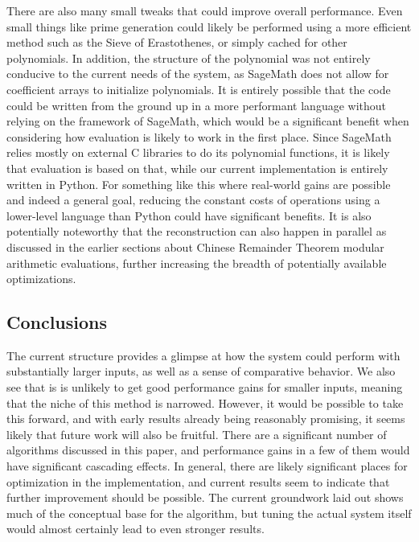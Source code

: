 \documentclass[pageno]{jpaper}
\begin{document}
There are also many small tweaks that could improve overall performance.
Even small things like prime generation could likely be performed using a more efficient method such as the Sieve of Erastothenes, or simply cached for other polynomials.
In addition, the structure of the polynomial was not entirely conducive to the current needs of the system, as SageMath does not allow for coefficient arrays to initialize polynomials.
It is entirely possible that the code could be written from the ground up in a more performant language without relying on the framework of SageMath, which would be a significant benefit when considering how evaluation is likely to work in the first place.
Since SageMath relies mostly on external C libraries to do its polynomial functions, it is likely that evaluation is based on that, while our current implementation is entirely written in Python.
For something like this where real-world gains are possible and indeed a general goal, reducing the constant costs of operations using a lower-level language than Python could have significant benefits.
It is also potentially noteworthy that the reconstruction can also happen in parallel as discussed in the earlier sections about Chinese Remainder Theorem modular arithmetic evaluations, further increasing the breadth of potentially available optimizations.
\subsection{Conclusions}
The current structure provides a glimpse at how the system could perform with substantially larger inputs, as well as a sense of comparative behavior.
We also see that is is unlikely to get good performance gains for smaller inputs, meaning that the niche of this method is narrowed.
However, it would be possible to take this forward, and with early results already being reasonably promising, it seems likely that future work will also be fruitful.
There are a significant number of algorithms discussed in this paper, and performance gains in a few of them would have significant cascading effects.
In general, there are likely significant places for optimization in the implementation, and current results seem to indicate that further improvement should be possible.
The current groundwork laid out shows much of the conceptual base for the algorithm, but tuning the actual system itself would almost certainly lead to even stronger results.



\nocite{*}
\end{document}
